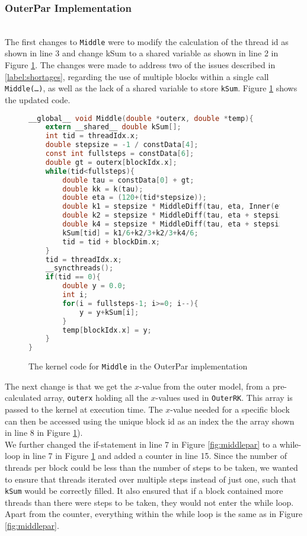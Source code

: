 \subsubsection{OuterPar Implementation} \hfill \\
The first changes to \texttt{Middle} were to modify the calculation of the thread id as shown in line 3 and change kSum to a shared variable as shown in line 2 in Figure \ref{fig:outerpar}. The changes were made to address two of the issues described in \ref{label:shortages}, regarding the use of multiple blocks within a single call \texttt{Middle(…)}, as well as the lack of a shared variable to store \texttt{kSum}. Figure \ref{fig:outerpar} shows the updated code.

\begin{figure}[ht]
\begin{lstlisting}[language=c]
__global__ void Middle(double *outerx, double *temp){
	extern __shared__ double kSum[];
	int tid = threadIdx.x;
	double stepsize = -1 / constData[4];
	const int fullsteps = constData[6];
	double gt = outerx[blockIdx.x];
	while(tid<fullsteps){
		double tau = constData[0] + gt;
		double kk = k(tau);
		double eta = (120+(tid*stepsize));
		double k1 = stepsize * MiddleDiff(tau, eta, Inner(eta, gt, kk).y);
		double k2 = stepsize * MiddleDiff(tau, eta + stepsize/2, Inner(eta + stepsize/2, gt, kk).y);		
		double k4 = stepsize * MiddleDiff(tau, eta + stepsize, Inner(eta + stepsize, gt, kk).y);
		kSum[tid] = k1/6+k2/3+k2/3+k4/6;
		tid = tid + blockDim.x;
	}
	tid = threadIdx.x;
	__syncthreads();
	if(tid == 0){
		double y = 0.0;
		int i;
		for(i = fullsteps-1; i>=0; i--){
			y = y+kSum[i];
		}
		temp[blockIdx.x] = y;
	}
}
\end{lstlisting}
\caption{The kernel code for \texttt{Middle} in the OuterPar implementation}
\label{fig:outerpar}
\end{figure}

The next change is that we get the $x$-value from the outer model, from a pre-calculated array, \texttt{outerx} holding all the $x$-values used in \texttt{OuterRK}. This array is passed to the kernel at execution time. The $x$-value needed for a specific block can then be accessed using the unique block id as an index the the array shown in line 8 in Figure \ref{fig:outerpar}).\\

We further changed the if-statement in line 7 in Figure \ref{fig:middlepar} to a while-loop in line 7 in Figure \ref{fig:outerpar} and added a counter in line 15. Since the number of threads per block could be less than the number of steps to be taken, we wanted to ensure that threads iterated over multiple steps instead of just one, such that \texttt{kSum} would be correctly filled. It also ensured that if a block contained more threads than there were steps to be taken, they would not enter the while loop. Apart from the counter, everything within the while loop is the same as in Figure \ref{fig:middlepar}.\\ \\

